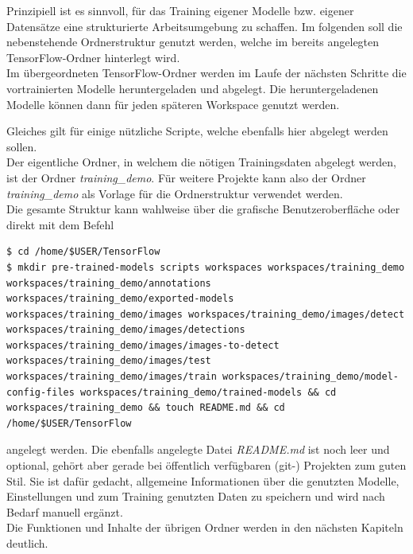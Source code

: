 \documentclass[12pt, oneside]{article}
\begin{document}
Prinzipiell ist es sinnvoll, für das Training eigener Modelle bzw. eigener Datensätze eine strukturierte Arbeitsumgebung zu schaffen. Im folgenden soll die nebenstehende Ordnerstruktur genutzt werden, welche im bereits angelegten TensorFlow-Ordner hinterlegt wird.\\

Im übergeordneten TensorFlow-Ordner werden im Laufe der nächsten Schritte die vortrainierten Modelle heruntergeladen und abgelegt. Die heruntergeladenen Modelle können dann für jeden späteren Workspace genutzt werden.

Gleiches gilt für einige nützliche Scripte, welche ebenfalls hier abgelegt werden sollen.\\

Der eigentliche Ordner, in welchem die nötigen Trainingsdaten abgelegt werden, ist der Ordner \textit{training\_demo}. Für weitere Projekte kann also der Ordner \textit{training\_demo} als Vorlage für die Ordnerstruktur verwendet werden.\\

Die gesamte Struktur kann wahlweise über die grafische Benutzeroberfläche oder direkt mit dem Befehl

\noindent\begin{minipage}{0.67\textwidth}
\begin{verbatim}    
$ cd /home/$USER/TensorFlow
$ mkdir pre-trained-models scripts workspaces workspaces/training_demo workspaces/training_demo/annotations workspaces/training_demo/exported-models workspaces/training_demo/images workspaces/training_demo/images/detect workspaces/training_demo/images/detections workspaces/training_demo/images/images-to-detect workspaces/training_demo/images/test workspaces/training_demo/images/train workspaces/training_demo/model-config-files workspaces/training_demo/trained-models && cd workspaces/training_demo && touch README.md && cd /home/$USER/TensorFlow
\end{verbatim}
\end{minipage}
angelegt werden. Die ebenfalls angelegte Datei \textit{README.md} ist noch leer und optional, gehört aber gerade bei öffentlich verfügbaren (git-) Projekten zum guten Stil. Sie ist dafür gedacht, allgemeine Informationen über die genutzten Modelle, Einstellungen und zum Training genutzten Daten zu speichern und wird nach Bedarf manuell ergänzt.\\

Die Funktionen und Inhalte der übrigen Ordner werden in den nächsten Kapiteln deutlich.
\end{document}
